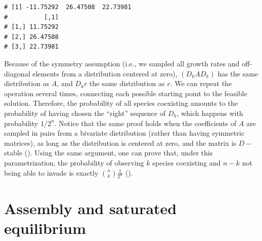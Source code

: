 \documentclass[]{book}
\newenvironment{Shaded}{\begin{snugshade}}{\end{snugshade}}
\newcommand{\CommentTok}[1]{\textcolor[rgb]{0.56,0.35,0.01}{\textit{#1}}}
\newcommand{\DecValTok}[1]{\textcolor[rgb]{0.00,0.00,0.81}{#1}}
\newcommand{\KeywordTok}[1]{\textcolor[rgb]{0.13,0.29,0.53}{\textbf{#1}}}
\newcommand{\NormalTok}[1]{#1}
\newcommand{\OperatorTok}[1]{\textcolor[rgb]{0.81,0.36,0.00}{\textbf{#1}}}
\newcommand{\StringTok}[1]{\textcolor[rgb]{0.31,0.60,0.02}{#1}}
\begin{document}
\begin{Shaded}
\end{Shaded}

\begin{verbatim}
# [1] -11.75292  26.47508  22.73981
#          [,1]
# [1,] 11.75292
# [2,] 26.47508
# [3,] 22.73981
\end{verbatim}

Because of the symmetry assumption (i.e., we sampled all growth rates and off-diagonal elements from a distribution centered at zero), \((D_k A D_k)\) has the same distribution as \(A\), and \(D_k r\) the same distribution as \(r\). We can repeat the operation several times, connecting each possible starting point to the feasible solution. Therefore, the probability of all species coexisting amounts to the probability of having chosen the ``right'' sequence of \(D_k\), which happens with probability \(1 / 2^n\). Notice that the same proof holds when the coefficients of \(A\) are sampled in pairs from a bivariate distribution (rather than having symmetric matrices), as long as the distribution is centered at zero, and the matrix is \(D-\)stable (\citet{servan2018coexistence}). Using the same argument, one can prove that, under this parametrization, the probability of observing \(k\) species coexisting and \(n -k\) not being able to invade is exactly \(\binom{n}{k} \frac{1}{2^n}\) (\citet{servan2018coexistence}).

\hypertarget{assembly-and-saturated-equilibrium}{%
\section{Assembly and saturated equilibrium}\label{assembly-and-saturated-equilibrium}}
\end{document}
